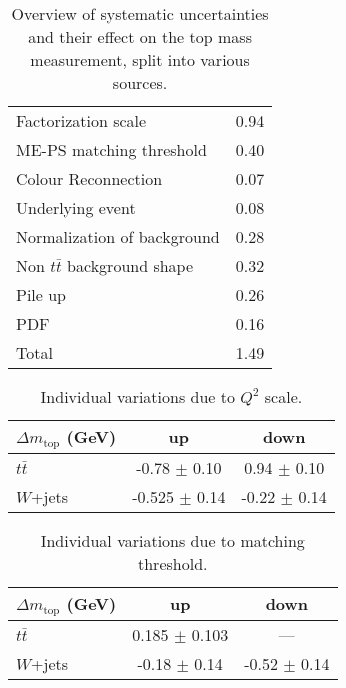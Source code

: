 \begin{table}[!htp]
\begin{center}
\begin{tabular}{l|c}
Factorization scale                & 0.94 \\
ME-PS matching threshold           & 0.40 \\
Colour Reconnection                & 0.07 \\
Underlying event                   & 0.08 \\
Normalization of background        & 0.28 \\
Non $t\bar{t}$ background shape    & 0.32 \\
Pile up                            & 0.26 \\
PDF                                & 0.16 \\
\hline
Total                              & 1.49 \\
\hline\hline
\end{tabular}
\caption{\label{tab:systematics}Overview of systematic uncertainties
and their effect on the top mass measurement, split into various sources.}
\end{center}
\end{table}


\begin{table}[!htp]
\begin{center}
\begin{tabular}{l|c|c}
\hline\hline
$\Delta m_{\textrm{top}}$ (GeV)        & up  & down\\
\hline
$t \bar t$      & -0.78  $\pm$ 0.10 & 0.94 $\pm$ 0.10 \\
$W$+jets        & -0.525 $\pm$ 0.14 & -0.22 $\pm$ 0.14 \\
\hline\hline
\end{tabular}
\caption{\label{tab:systematicsScale}Individual variations due to $Q^2$ scale.}
\end{center}
\end{table}


\begin{table}[!htp]
\begin{center}
\begin{tabular}{l|c|c}
\hline\hline
$\Delta m_{\textrm{top}}$ (GeV)        & up  & down\\
\hline
$t \bar t$   &0.185 $\pm$ 0.103 & --- \\
$W$+jets     & -0.18 $\pm$ 0.14 & -0.52 $\pm$ 0.14 \\
\hline\hline
\end{tabular}
\caption{\label{tab:systematicsMatching}Individual variations due to matching threshold.}
\end{center}
\end{table}


